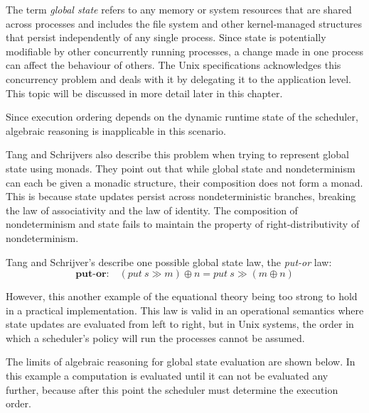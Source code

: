\documentclass[logo,bsc,singlespacing,parskip]{infthesis}
\begin{document}
The term \textit{global state} refers to any memory or system resources that are shared across processes and includes the file system and other kernel-managed structures that persist independently of any single process. Since {state} is potentially modifiable by other concurrently running processes, a change made in one process can affect the behaviour of others. The Unix specifications acknowledges this concurrency problem and deals with it by delegating it to the application level. This topic will be discussed in more detail later in this chapter. 

Since execution ordering depends on the dynamic runtime state of the scheduler, algebraic reasoning is inapplicable in this scenario. 

Tang and Schrijvers also describe this problem when trying to represent global state using monads. They point out that while global state and nondeterminism can each be given a monadic structure, their composition does not form a monad. This is because state updates persist across nondeterministic branches, breaking the law of associativity and the law of identity. The composition of {nondeterminism} and {state} fails to maintain the property of right-distributivity of {nondeterminism}.


Tang and Schrijver's describe one possible global state law, the \textit{put-or} law: 
\[
\textbf{put-or:} \quad (put\ s \gg m) \oplus n = put\ s \gg (m \oplus n) 
\]

However, this another example of the equational theory being too strong to hold in a practical implementation. This law is valid in an {operational semantics} where state updates are evaluated from left to right, but in Unix systems, the order in which a scheduler's policy will run the processes cannot be assumed.


The limits of algebraic reasoning for global state evaluation are shown below. In this example a computation is evaluated until it can not be evaluated any further, because after this point the scheduler must determine the execution order.
\end{document}
